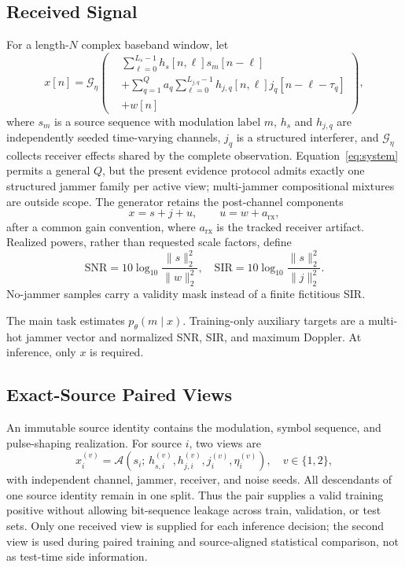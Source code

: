 \documentclass[letterpaper,journal]{IEEEtran}
\begin{document}
\subsection{Received Signal}
For a length-$N$ complex baseband window, let
\begin{equation}
x[n]=\mathcal{G}_{\eta}\!\left(
\begin{aligned}
&\sum_{\ell=0}^{L_s-1}h_s[n,\ell]s_m[n-\ell]\\
&+\sum_{q=1}^{Q}a_q\sum_{\ell=0}^{L_{j,q}-1}
h_{j,q}[n,\ell]j_q[n-\ell-\tau_q]\\
&+w[n]
\end{aligned}
\right),
\label{eq:system}
\end{equation}
where $s_m$ is a source sequence with modulation label $m$, $h_s$ and
$h_{j,q}$ are independently seeded time-varying channels, $j_q$ is a
structured interferer, and $\mathcal{G}_{\eta}$ collects receiver effects
shared by the complete observation.  Equation~\eqref{eq:system} permits a
general $Q$, but the present evidence protocol admits exactly one structured
jammer family per active view; multi-jammer compositional mixtures are outside
scope.  The generator retains the
post-channel components
\begin{equation}
x=s+j+u,\qquad u=w+a_{\mathrm{rx}},
\label{eq:components}
\end{equation}
after a common gain convention, where $a_{\mathrm{rx}}$ is the tracked
receiver artifact.  Realized powers, rather than requested scale factors,
define
\begin{equation}
\mathrm{SNR}=10\log_{10}\frac{\|s\|_2^2}{\|w\|_2^2},\quad
\mathrm{SIR}=10\log_{10}\frac{\|s\|_2^2}{\|j\|_2^2}.
\label{eq:snrsir}
\end{equation}
No-jammer samples carry a validity mask instead of a finite fictitious SIR.

The main task estimates $p_\theta(m\mid x)$.  Training-only auxiliary targets
are a multi-hot jammer vector and normalized SNR, SIR, and maximum Doppler.
At inference, only $x$ is required.

\subsection{Exact-Source Paired Views}
An immutable source identity contains the modulation, symbol sequence, and
pulse-shaping realization.  For source $i$, two views are
\begin{equation}
x_i^{(v)}=\mathcal{A}\!\left(
s_i;\,h_{s,i}^{(v)},h_{j,i}^{(v)},j_i^{(v)},\eta_i^{(v)}
\right),\quad v\in\{1,2\},
\label{eq:views}
\end{equation}
with independent channel, jammer, receiver, and noise seeds.  All descendants
of one source identity remain in one split.  Thus the pair supplies a valid
training positive without allowing bit-sequence leakage across train,
validation, or test sets.  Only one received view is supplied for each
inference decision; the second view is used during paired training and
source-aligned statistical comparison, not as test-time side information.
\end{document}
